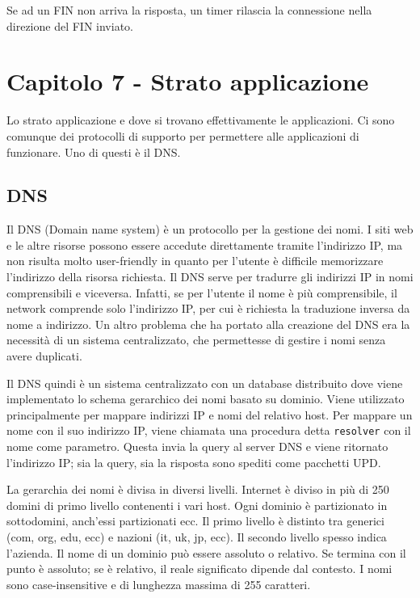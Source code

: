 Se ad un FIN non arriva la risposta, un timer rilascia la connessione nella direzione del FIN inviato.

\newpage
\section{Capitolo 7 - Strato applicazione}

Lo strato applicazione e dove si trovano effettivamente le applicazioni.
Ci sono comunque dei protocolli di supporto per permettere alle applicazioni di funzionare.
Uno di questi è il DNS.

\subsection{DNS}

Il DNS (Domain name system) è un protocollo per la gestione dei nomi.
I siti web e le altre risorse possono essere accedute direttamente tramite l'indirizzo IP,
ma non risulta molto user-friendly in quanto per l'utente è difficile memorizzare l'indirizzo della risorsa richiesta.
Il DNS serve per tradurre gli indirizzi IP in nomi comprensibili e viceversa.
Infatti, se per l'utente il nome è più comprensibile, il network comprende solo l'indirizzo IP, per cui è richiesta la traduzione inversa da nome a indirizzo.
Un altro problema che ha portato alla creazione del DNS era la necessità di un sistema centralizzato, che permettesse di gestire i nomi senza avere duplicati.

Il DNS quindi è un sistema centralizzato con un database distribuito dove viene implementato lo schema gerarchico dei nomi basato su dominio. 
Viene utilizzato principalmente per mappare indirizzi IP e nomi del relativo host.
Per mappare un nome con il suo indirizzo IP, viene chiamata una procedura detta \texttt{resolver} con il nome come parametro.
Questa invia la query al server DNS e viene ritornato l'indirizzo IP; sia la query, sia la risposta sono spediti come pacchetti UPD.

La gerarchia dei nomi è divisa in diversi livelli. 
Internet è diviso in più di 250 domini di primo livello contenenti i vari host. 
Ogni dominio è partizionato in sottodomini, anch'essi partizionati ecc.
Il primo livello è distinto tra generici (com, org, edu, ecc) e nazioni (it, uk, jp, ecc).
Il secondo livello spesso indica l'azienda.
Il nome di un dominio può essere assoluto o relativo.
Se termina con il punto è assoluto; se è relativo, il reale significato dipende dal contesto.
I nomi sono case-insensitive e di lunghezza massima di 255 caratteri.

